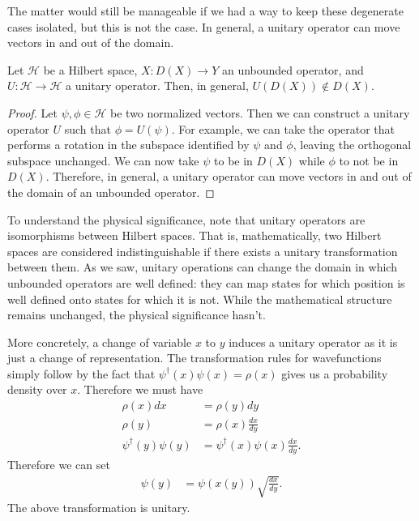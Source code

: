 \documentclass[10pt,twocolumn, nofootinbib]{revtex4-2}
\begin{document}
The matter would still be manageable if we had a way to keep these degenerate cases isolated, but this is not the case. In general, a unitary operator can move vectors in and out of the domain.
\begin{prop}
Let $\mathcal{H}$ be a Hilbert space, $X : D(X) \to Y$ an unbounded operator, and $U : \mathcal{H} \to \mathcal{H}$ a unitary operator. Then, in general, $U(D(X)) \notin D(X)$.
\end{prop}
\begin{proof}
Let $\psi, \phi \in \mathcal{H}$ be two normalized vectors. Then we can construct a unitary operator $U$ such that $\phi = U(\psi)$. For example, we can take the operator that performs a rotation in the subspace identified by $\psi$ and $\phi$, leaving the orthogonal subspace unchanged. We can now take $\psi$ to be in $D(X)$ while $\phi$ to not be in $D(X)$. Therefore, in general, a unitary operator can move vectors in and out of the domain of an unbounded operator.
\end{proof}

To understand the physical significance, note that unitary operators are isomorphisms between Hilbert spaces. That is, mathematically, two Hilbert spaces are considered indistinguishable if there exists a unitary transformation between them. As we saw, unitary operations can change the domain in which unbounded operators are well defined: they can map states for which position is well defined onto states for which it is not. While the mathematical structure remains unchanged, the physical significance hasn't.

More concretely, a change of variable $x$ to $y$ induces a unitary operator as it is just a change of representation. The transformation rules for wavefunctions simply follow by the fact that $\psi^\dagger(x) \psi(x) = \rho(x)$ gives us a probability density over $x$. Therefore we must have
\begin{equation}
	\begin{aligned}
		\rho(x) dx &= \rho(y) dy \\
		\rho(y) &= \rho(x) \frac{dx}{dy} \\
		\psi^\dagger(y) \psi(y) &= \psi^\dagger(x) \psi(x) \frac{dx}{dy}.
	\end{aligned}
\end{equation}
Therefore we can set 
\begin{equation}
	\begin{aligned}
		\psi(y) &= \psi(x(y)) \sqrt{\frac{dx}{dy}}.
	\end{aligned}
\end{equation}
The above transformation is unitary.
\end{document}
